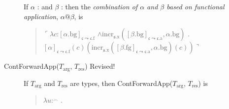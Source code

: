 \begin{description}
  If $\alpha$ :  
and $\beta$ : 
                         then the \textit{combination of $\alpha$ and
    $\beta$  based on functional application}, $\alpha\text{@}\beta$, is
  \begin{quote}
    $\ulcorner\lambda c$:$[\alpha.\text{bg}]_{\mathfrak{c}\leadsto\mathfrak{c}.\text{f}}$
      \d{$\wedge$}$\mathrm{incr}_{\mathfrak{s}.\text{x}}([\beta.\text{bg}]_{\mathfrak{c}\leadsto\mathfrak{c}.\text{a}},\alpha.\text{bg})$
      . \\ \hspace*{2em}$[\alpha]_{\mathfrak{c}\leadsto\mathfrak{c}.\text{f}}(c)(\mathrm{incr}_{\mathfrak{s}.\text{x}}([\beta.\text{fg}]_{\mathfrak{c}\leadsto\mathfrak{c}.\text{a}},\alpha.\text{bg})(c))\urcorner$
      
\end{quote}


\item[\textnormal{ContForwardApp($T_{\text{arg}}$, $T_{\text{res}}$)}
  Revised!] \mbox{}

  If $T_{\text{arg}}$ and $T_{\text{res}}$ are types, then
  ContForwardApp($T_{\text{arg}}$, $T_{\text{res}}$) is
\begin{quote}
  $\lambda
u$:$^{\frown}$
    . \\
\hspace*{2em}
\end{quote}
  

\end{description}
